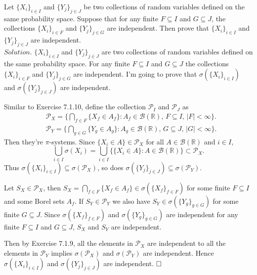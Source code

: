 \label{7.1.11}
Let $\{X_i\}_{i\in I}$ and $\{Y_j\}_{j\in J}$ be two collections of random variables defined on the same probability space. Suppose that for any finite $F\subseteq I$ and $G\subseteq J$, the collections $\{X_i\}_{i\in F}$ and $\{Y_j\}_{j\in G}$ are independent. Then prove that $\{X_i\}_{i\in I}$ and $\{Y_j\}_{j\in J}$ are independent.\\

\noindent$Solution.$
$\{X_i\}_{i\in I}$ and $\{Y_j\}_{j\in J}$ are two collections of random variables defined on the same probability space. For any finite $F\subseteq I$ and $G\subseteq J$ the collections $\{X_i\}_{i\in F}$ and $\{Y_j\}_{j\in G}$ are independent. I'm going to prove that $\sigma(\{X_i\}_{i\in I})$ and $\sigma(\{Y_j\}_{j\in J})$ are independent.

Similar to Exercise 7.1.10, define the collection $\mathcal{P}_I$ and $\mathcal{P}_J$ as
\begin{align*}
    &\mathcal{P}_X=\Big\{\bigcap_{f\in F}\{X_{f}\in A_f\}:A_f\in\mathcal{B}(\mathbb{R}),\,F\subseteq I\Big,\,|F|<\infty\Big\}.\\
    &\mathcal{P}_Y=\Big\{\bigcap_{g\in G}\{Y_{g}\in A_g\}:A_g\in\mathcal{B}(\mathbb{R}),\,G\subseteq J,\,|G|<\infty\Big\}.
\end{align*}
Then they're $\pi$-systems. Since $\{X_i\in A\}\in\mathcal{P}_X$ for all $A\in\mathcal{B}(\mathbb{R})$ and $i\in I$,
\begin{equation*}
    \bigcup_{i\in I}\sigma(X_i)=\bigcup_{i\in I}\Big\{\{X_i\in A\}:A\in\mathcal{B}(\mathbb{R})\Big\}\subset\mathcal{P}_X.
\end{equation*}
Thus $\sigma(\{X_i\}_{i\in I})\subseteq\sigma(\mathcal{P}_X)$, so does $\sigma(\{Y_j\}_{j\in J})\subseteq\sigma(\mathcal{P}_Y)$.

Let $S_X\in\mathcal{P}_X$, then $S_X=\bigcap_{f\in F}\{X_f\in A_f\}\in\sigma(\{X_f\}_{f\in F})$ for some finite $F\subseteq I$ and some Borel sets $A_f$. If $S_Y\in\mathcal{P}_Y$ we also have $S_Y\in\sigma(\{Y_g\}_{g\in G})$ for some finite $G\subseteq J$. Since $\sigma(\{X_f\}_{f\in F})$ and $\sigma(\{Y_g\}_{g\in G})$ are independent for any finite $F\subseteq I$ and $G\subseteq J$, $S_X$ and $S_Y$ are independent.

Then by Exercise 7.1.9, all the elements in $\mathcal{P}_X$ are independent to all the elements in $\mathcal{P}_Y$ implies $\sigma(\mathcal{P}_X)$ and $\sigma(\mathcal{P}_Y)$ are independent. Hence $\sigma(\{X_i\}_{i\in I})$ and $\sigma(\{Y_j\}_{j\in J})$ are independent.
$\hspace{\fill}\square$\\

